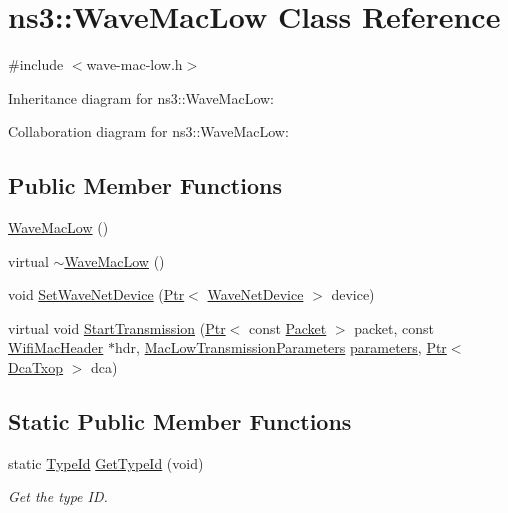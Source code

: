 \hypertarget{classns3_1_1WaveMacLow}{}\section{ns3\+:\+:Wave\+Mac\+Low Class Reference}
\label{classns3_1_1WaveMacLow}


{\ttfamily \#include $<$wave-\/mac-\/low.\+h$>$}



Inheritance diagram for ns3\+:\+:Wave\+Mac\+Low\+:


Collaboration diagram for ns3\+:\+:Wave\+Mac\+Low\+:
\subsection*{Public Member Functions}
\begin{DoxyCompactItemize}
\item 
\hyperlink{classns3_1_1WaveMacLow_a012cad9c97c64c0bae87a610b4bd9629}{Wave\+Mac\+Low} ()
\item 
virtual \hyperlink{classns3_1_1WaveMacLow_a4e2f0588d6dc5e6482e35ab430e02cfb}{$\sim$\+Wave\+Mac\+Low} ()
\item 
void \hyperlink{classns3_1_1WaveMacLow_ae281e92c043000830a4c85261501f50d}{Set\+Wave\+Net\+Device} (\hyperlink{classns3_1_1Ptr}{Ptr}$<$ \hyperlink{classns3_1_1WaveNetDevice}{Wave\+Net\+Device} $>$ device)
\item 
virtual void \hyperlink{classns3_1_1WaveMacLow_a8ed4704fbcd3d5888aa8ee5abcfb9cc8}{Start\+Transmission} (\hyperlink{classns3_1_1Ptr}{Ptr}$<$ const \hyperlink{classns3_1_1Packet}{Packet} $>$ packet, const \hyperlink{classns3_1_1WifiMacHeader}{Wifi\+Mac\+Header} $\ast$hdr, \hyperlink{classns3_1_1MacLowTransmissionParameters}{Mac\+Low\+Transmission\+Parameters} \hyperlink{design_8txt_a61257d1df1c87e8bd4ba94cacb4982cf}{parameters}, \hyperlink{classns3_1_1Ptr}{Ptr}$<$ \hyperlink{classns3_1_1DcaTxop}{Dca\+Txop} $>$ dca)
\end{DoxyCompactItemize}
\subsection*{Static Public Member Functions}
\begin{DoxyCompactItemize}
\item 
static \hyperlink{classns3_1_1TypeId}{Type\+Id} \hyperlink{classns3_1_1WaveMacLow_a06f3e0dd0f330e260f4538dcc321ed8b}{Get\+Type\+Id} (void)
\begin{DoxyCompactList}\small\item\em Get the type ID. \end{DoxyCompactList}\end{DoxyCompactItemize}
